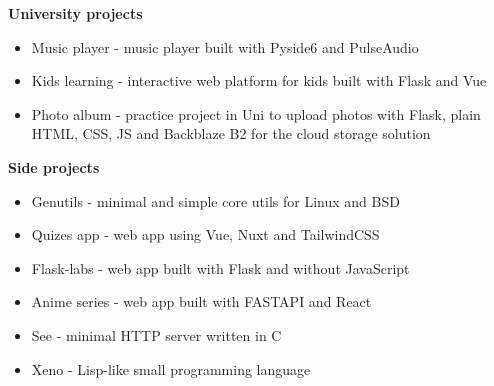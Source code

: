 {
    {\vspace{0.5cm} \hspace{-0.5cm} \Large \textbf{University projects}}
    \begin{itemize}
        \item {Music player - music player built with Pyside6 and PulseAudio}
        \item {Kids learning - interactive web platform for kids built with Flask and Vue}
        \item {
            Photo album - practice project in Uni to upload photos with Flask, 
            plain HTML, CSS, JS and Backblaze B2 for the cloud storage solution
        }
    \end{itemize}

    {\vspace{0.5cm} \hspace{-1cm} \Large \textbf{Side projects}}

    \begin{itemize}
        \item {Genutils - minimal and simple core utils for Linux and BSD}
        \item {Quizes app - web app using Vue, Nuxt and TailwindCSS}
        \item {Flask-labs - web app built with Flask and without JavaScript}
        \item {Anime series - web app built with FASTAPI and React}
        \item {See - minimal HTTP server written in C}
        \item {Xeno - Lisp-like small programming language}
    \end{itemize}
}
